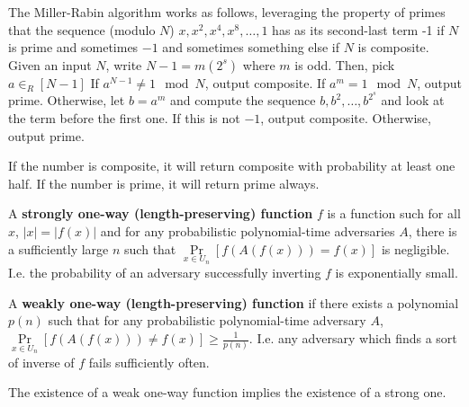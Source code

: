 The Miller-Rabin algorithm works as follows, leveraging the property of primes that the sequence (modulo $N$) $x,x^2,x^4,x^8,\dots,1$ has as its second-last term -1 if $N$ is prime and sometimes $-1$ and sometimes something else if $N$ is composite.  Given an input $N$, write $N-1 = m(2^s)$ where $m$ is odd.  Then, pick $a\in_R[N-1]$  If $a^{N-1}\neq 1 \mod N$, output composite.  If $a^m=1\mod N$, output prime.  Otherwise, let $b=a^m$ and compute the sequence $b,b^2,\dots,b^{2^s} $ and look at the term before the first one.  If this is not $-1$, output composite. Otherwise, output prime.

If the number is composite, it will return composite with probability at least one half.  If the number is prime, it will return prime always.



\begin{definition}
	A \textbf{strongly one-way (length-preserving) function} $f$ is a function such for all $x$, $|x|=|f(x)|$ and for any probabilistic polynomial-time adversaries $A$, there is a sufficiently large $n$ such that $\Pr\limits_{x\in U_n}\left[ f(A(f(x)))  = f(x)       \right]$ is negligible.  I.e. the probability of an adversary successfully inverting $f$ is exponentially small.
	
	A \textbf{weakly one-way (length-preserving) function} if there exists a polynomial $p(n)$ such that for any probabilistic polynomial-time adversary $A$, $\Pr\limits_{x\in U_n}\left[f(A(f(x))) \neq f(x)\right] \geq \frac{1}{p(n)}$.  I.e. any adversary which finds a sort of inverse of $f$  fails sufficiently often.
\end{definition}


\begin{lemma}
	
	The existence of a weak one-way function implies the existence of a strong one.
	
	
\end{lemma}


